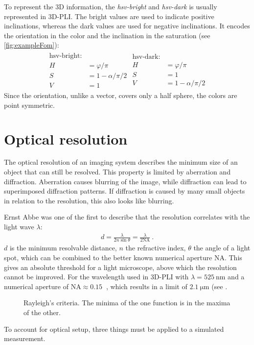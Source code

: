 To represent the 3D information, the \textit{hsv-bright} and \textit{hsv-dark} is usually represented in \ac{3D-PLI}. The bright values are used to indicate positive inclinations, whereas the dark values are used for negative inclinations.
It encodes the orientation in the color and the inclination in the saturation (see \cref{fig:exampleFom}):
\begin{align}
\begin{split}
    \text{hsv-bright:}\\
    H &= \varphi/\pi\\
    S &= 1-\alpha / \pi/2\\
    V &= 1
\end{split}
\begin{split}
    \text{hsv-dark:}\\
    H &= \varphi/\pi\\
    S &= 1\\
    V &= 1-\alpha / \pi/2
\end{split}
\end{align}
Since the orientation, unlike a vector, covers only a half sphere, the colors are point symmetric.
%
%
\section{Optical resolution}
\label{sec:opticalResolution}
%
The optical resolution of an imaging system describes the minimum size of an object that can still be resolved.
This property is limited by aberration and diffraction.
Aberration causes blurring of the image, while diffraction can lead to superimposed diffraction patterns.
If diffraction is caused by many small objects in relation to the resolution, this also looks like blurring.
\par
%
Ernst Abbe was one of the first to describe that the resolution correlates with the light wave $\lambda$:
\begin{align}
d=\frac{ \lambda}{2 n \sin \theta} = \frac{\lambda}{2\mathrm{NA}} \> .
\end{align}
$d$ is the minimum resolvable distance, $n$ the refractive index, $\theta$ the angle of a light spot, which can be combined to the better known numerical aperture $\mathrm{NA}$.
This gives an absolute threshold for a light microscope, above which the resolution cannot be improved.
For the wavelength used in \ac{3D-PLI} with $\lambda = \SI{525}{\nano\meter}$ and a numerical aperture of $\mathrm{NA} \approx \SI{0.15}{}$ , which results in a limit of $\SI{2.1}{\micro\meter}$ (see \cite{MenzelDissertation}.
%
\begin{figure}[!t]
\setlength{\tikzwidth}{0.45\textwidth}
\centering
\caption[Raylay criterium]{Rayleigh's criteria. The minima of the one function is in the maxima of the other.}
\label{fig:rayleigh}
\end{figure}
%
To account for optical setup, three things must be applied to a simulated measurement.
%
